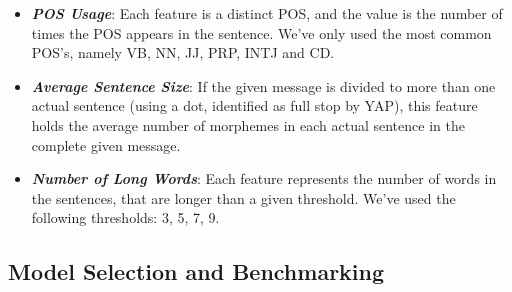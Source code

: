 \documentclass[a4paper]{article}
\begin{document}
\begin{itemize}
\item \textbf{\emph{POS Usage}}: Each feature is a distinct POS, and the value is the number of times the POS appears in the sentence. We've only used the most common POS's, namely VB, NN, JJ, PRP, INTJ and CD.
\item \textbf{\emph{Average Sentence Size}}: If the given message is divided to more than one actual sentence (using a dot, identified as full stop by YAP), this feature holds the average number of morphemes in each actual sentence in the complete given message.
\item \textbf{\emph{Number of Long Words}}: Each feature represents the number of words in the sentences, that are longer than a given threshold. We've used the following thresholds: 3, 5, 7, 9.
\end{itemize}

\subsection{Model Selection and Benchmarking}
\end{document}
